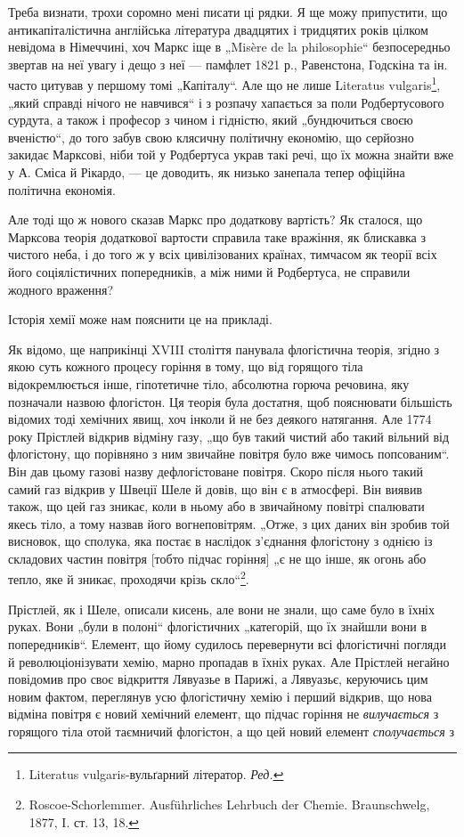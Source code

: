 Треба визнати, трохи соромно мені писати ці рядки. Я ще можу
припустити, що антикапіталістична англійська література двадцятих і
тридцятих років цілком невідома в Німеччині, хоч Маркс іще в „Misère
de la philosophie“ безпосередньо звертав на неї увагу і дещо з неї —
памфлет 1821 р., Равенстона, Годскіна та ін. часто цитував у першому
томі „Капіталу“. Але що не лише Literatus vulgaris\footnote*{
Literatus vulgaris-вульґарний літератор. \emph{Ред.}
}, „який справді
нічого не навчився“ і з розпачу хапається за поли Родбертусового сурдута,
а також і професор з чином і гідністю, який „бундючиться
своєю вченістю“, до того забув свою клясичну політичну економію, що
серйозно закидає Марксові, ніби той у Родбертуса украв такі речі, що
їх можна знайти вже у А. Сміса й Рікардо, — це доводить, як низько
занепала тепер офіційна політична економія.

Але тоді що ж нового сказав Маркс про додаткову вартість? Як
сталося, що Марксова теорія додаткової вартости справила таке вражіння,
як блискавка з чистого неба, і до того ж у всіх цивілізованих країнах,
тимчасом як теорії всіх його соціялістичних попередників, а між ними й
Родбертуса, не справили жодного враження?

Історія хемії може нам пояснити це на прикладі.

Як відомо, ще наприкінці XVIII століття панувала флогістична теорія,
згідно з якою суть кожного процесу горіння в тому, що від горящого
тіла відокремлюється інше, гіпотетичне тіло, абсолютна горюча речовина,
яку позначали назвою флогістон. Ця теорія була достатня, щоб пояснювати
більшість відомих тоді хемічних явищ, хоч інколи й не без деякого
натягання. Але 1774 року Прістлей відкрив відміну газу, „що був такий
чистий або такий вільний від флогістону, що порівняно з ним звичайне
повітря було вже чимось попсованим“. Він дав цьому газові назву дефлогістоване
повітря. Скоро після нього такий самий газ відкрив у Швеції
Шеле й довів, що він є в атмосфері. Він виявив також, що цей газ
зникає, коли в ньому або в звичайному повітрі спалювати якесь тіло, а
тому назвав його вогнеповітрям. „Отже, з цих даних він зробив той
висновок, що сполука, яка постає в наслідок з’єднання флогістону з
однією із складових частин повітря [тобто підчас горіння] „є не що
інше, як огонь або тепло, яке й зникає, проходячи крізь скло“\footnote{
Roscoe-Schorlemmer. Ausführliches Lehrbuch der Chemie. Braunschwelg, 1877,
I. ст. 13, 18.
}.

Прістлей, як і Шеле, описали кисень, але вони не знали, що саме
було в їхніх руках. Вони „були в полоні“ флогістичних „категорій, що
їх знайшли вони в попередників“. Елемент, що йому судилось перевернути
всі флогістичні погляди й революціонізувати хемію, марно пропадав
в їхніх руках. Але Прістлей негайно повідомив про своє відкриття
Лявуазье в Парижі, а Лявуазьє, керуючись цим новим фактом, переглянув
усю флогістичну хемію і перший відкрив, що нова відміна повітря
є новий хемічний елемент, що підчас горіння не \emph{вилучається} з горящого
тіла отой таємничий флогістон, а що цей новий елемент \emph{сполучається} з
\parbreak{}  %
